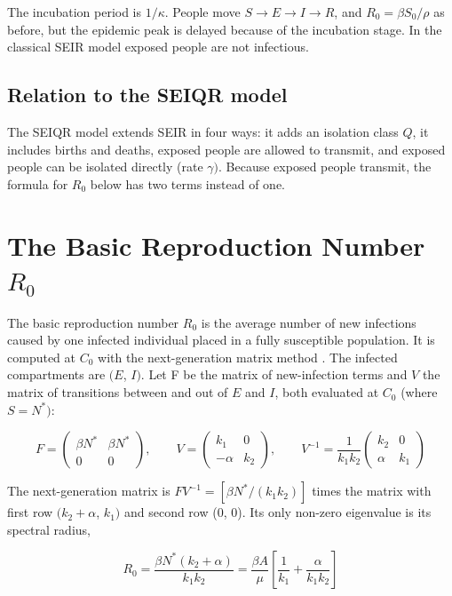 \documentclass[12pt,a4paper]{article}
\theoremstyle{definition}
\begin{document}
The incubation period is $1/\kappa$. People move $S \to E \to I \to R$, and $R_{0} = \beta S_{0}/\rho$ as before, but the epidemic peak is delayed because of the incubation stage. In the classical SEIR model exposed people are not infectious.


\subsection{Relation to the SEIQR model}

The SEIQR model extends SEIR in four ways: it adds an isolation class $Q$, it includes births and deaths, exposed people are allowed to transmit, and exposed people can be isolated directly (rate $\gamma )$. Because exposed people transmit, the formula for $R_{0}$ below has two terms instead of one.


\section{The Basic Reproduction Number $R_{0}$}

The basic reproduction number $R_{0}$ is the average number of new infections caused by one infected individual placed in a fully susceptible population. It is computed at $C_{0}$ with the next-generation matrix method \cite{r5,r6}. The infected compartments are $(E$, $I)$. Let F be the matrix of new-infection terms and $V$ the matrix of transitions between and out of $E$ and $I$, both evaluated at $C_{0}$ (where $S = N^*)$:


\[
F = \begin{pmatrix}\beta N^* & \beta N^*\\ 0 & 0\end{pmatrix},\qquad V = \begin{pmatrix}k_1 & 0\\ -\alpha & k_2\end{pmatrix},\qquad V^{-1} = \frac{1}{k_1k_2}\begin{pmatrix}k_2 & 0\\ \alpha & k_1\end{pmatrix}
\]

The next-generation matrix is $FV^{-1} = [\beta N^*/(k_{1}k_{2})]$ times the matrix with first row $(k_{2} + \alpha$, $k_{1})$ and second row (0, 0). Its only non-zero eigenvalue is its spectral radius,


\begin{equation}
R_0 = \frac{\beta N^*(k_2+\alpha)}{k_1k_2} = \frac{\beta A}{\mu}\left[\frac{1}{k_1}+\frac{\alpha}{k_1k_2}\right]
\end{equation}
\end{document}
